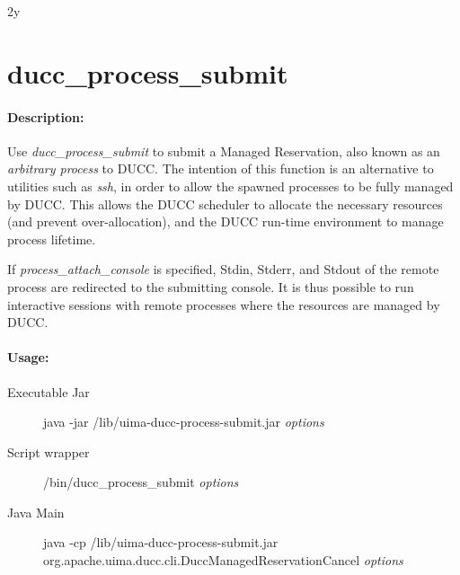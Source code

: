 2y%
\ifpdf
\else
{}
\fi
    \section{ducc\_process\_submit}
    \label{sec:cli.ducc-process-submit}
    \paragraph{Description:}
       Use {\em ducc\_process\_submit} to submit a Managed Reservation, also known as an
       {\em arbitrary process} to DUCC.  The intention
       of this function is an alternative to utilities such as {\em ssh}, in order to allow the
       spawned processes to be fully managed by DUCC.  This allows the DUCC scheduler to allocate
       the necessary resources (and prevent over-allocation), and the DUCC run-time environment
       to manage process lifetime.

       If {\em process\_attach\_console} is specified, Stdin, Stderr, and Stdout of the remote
       process are redirected to the submitting console.  It is thus possible to run interactive
       sessions with remote processes where the resources are managed by DUCC.

    \paragraph{Usage:}
    \begin{description}
    \item[Executable Jar] java -jar \ducchome/lib/uima-ducc-process-submit.jar {\em options}
    \item[Script wrapper] \ducchome/bin/ducc\_process\_submit {\em options}
    \item[Java Main]      java -cp \ducchome/lib/uima-ducc-process-submit.jar org.apache.uima.ducc.cli.DuccManagedReservationCancel {\em options}
    \end{description}


